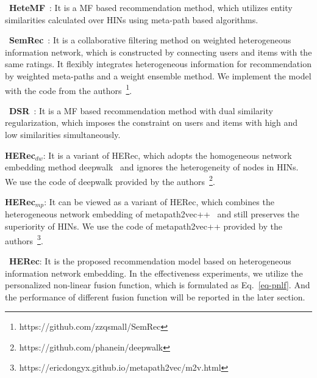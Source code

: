 \textbullet\ \textbf{HeteMF}~\cite{yu2013collaborative}: It is a MF based recommendation method, which utilizes entity similarities calculated over HINs using meta-path based algorithms.

\textbullet\ \textbf{SemRec}~\cite{shi2015semantic}: It is a collaborative filtering method on weighted heterogeneous information network, which is constructed by connecting users and items with the same ratings. It flexibly integrates heterogeneous information for recommendation by weighted meta-paths and a weight ensemble method. We implement the model with the code from the authors~\footnote{https://github.com/zzqsmall/SemRec}.


\textbullet\ \textbf{DSR}~\cite{zheng2017recommendation}: It is a MF based recommendation method with dual similarity regularization, which imposes the constraint on users and items with high and low similarities simultaneously.

\textbullet \textbf{HERec$_{dw}$}: It is a variant of HERec, which adopts the homogeneous network embedding method deepwalk~\cite{perozzi2014deepwalk} and ignores the heterogeneity
of nodes in HINs. We use the code of deepwalk provided by the authors~\footnote{https://github.com/phanein/deepwalk}.

\textbullet \textbf{HERec$_{mp}$}: It can be viewed as a variant of HERec, which combines the heterogeneous network embedding of metapath2vec++~\cite{dong2017metapath2vec} and still preserves the superiority of HINs. We use the code of metapath2vec++ provided by the authors~\footnote{https://ericdongyx.github.io/metapath2vec/m2v.html}.




\textbullet\ \textbf{HERec}: It is the proposed recommendation model based on heterogeneous information network embedding. In the effectiveness experiments, we utilize the personalized non-linear fusion function, which is formulated as Eq.~\ref{eq-pnlf}. And the performance of different fusion function will be reported in the later section.


